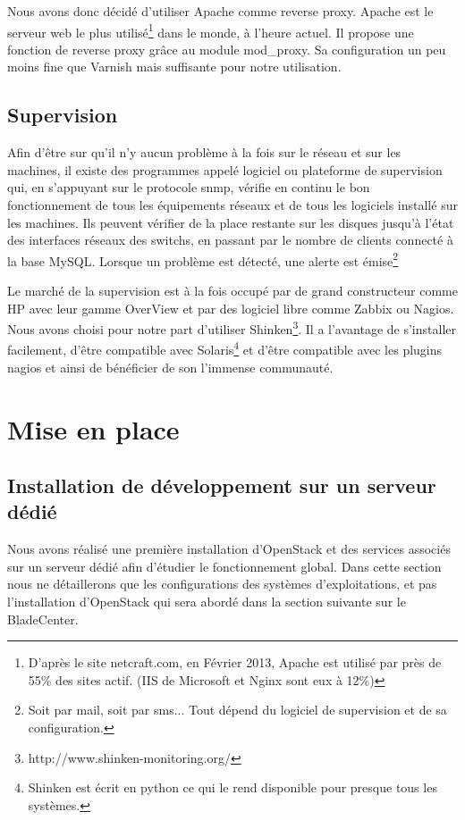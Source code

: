 \documentclass{report}
\begin{document}
Nous avons donc décidé d'utiliser Apache comme reverse proxy. Apache est le serveur web le plus utilisé\footnote{D'après le site netcraft.com, en Février 2013, Apache est utilisé par près de 55\% des sites actif. (IIS de Microsoft et Nginx sont eux à 12\%)} dans le monde, à l'heure actuel. Il propose une fonction de reverse proxy grâce au module mod\_proxy. Sa configuration un peu moins fine que Varnish mais suffisante pour notre utilisation.

\section{Supervision}
Afin d'être sur qu'il n'y aucun problème à la fois sur le réseau et sur les machines, il existe des programmes appelé logiciel ou plateforme de supervision qui, en s'appuyant sur le protocole snmp, vérifie en continu le bon fonctionnement de tous les équipements réseaux et de tous les logiciels installé sur les machines. Ils peuvent vérifier de la place restante sur les disques jusqu'à l'état des interfaces réseaux des switchs, en passant par le nombre de clients connecté à la base MySQL. Lorsque un problème est détecté, une alerte est émise\footnote{Soit par mail, soit par sms... Tout dépend du logiciel de supervision et de sa configuration.}

Le marché de la supervision est à la fois occupé par de grand constructeur comme HP avec leur gamme OverView et par des logiciel libre comme Zabbix ou Nagios. Nous avons choisi pour notre part d'utiliser Shinken\footnote{http://www.shinken-monitoring.org/}. Il a l'avantage de s'installer facilement, d'être compatible avec Solaris\footnote{Shinken est écrit en python ce qui le rend disponible pour presque tous les systèmes.} et d'être compatible avec les plugins nagios et ainsi de bénéficier de son l'immense communauté.

\chapter{Mise en place}
\section{Installation de développement sur un serveur dédié}
Nous avons réalisé une première installation d'OpenStack et des services associés sur un serveur dédié afin d'étudier le fonctionnement global. Dans cette section nous ne détaillerons que les configurations des systèmes d'exploitations, et pas l'installation d'OpenStack qui sera abordé dans la section suivante sur le BladeCenter.
\end{document}
